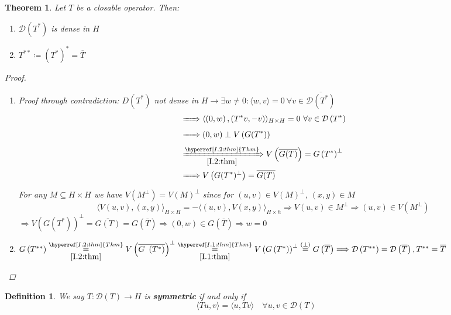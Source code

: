 \documentclass[12pt]{extreport} %
\newcommand{\DO}[1]{\mathcal{D}\left( {#1} \right)}
\theoremstyle{named}
\theoremstyle{nnamed}
\theoremstyle{itshape}
\newtheorem{definition}{Definition}  \counterwithin{definition}{chapter}
\newtheorem{theorem}{Theorem}  \counterwithin{theorem}{chapter}
\theoremstyle{normal}
\begin{document}
\begin{theorem} \label{I.3:thm}
	Let $T$ be a closable operator. Then:
	\begin{enumerate}
		\item $\DO{T^*}$ is dense in $H$
		\item $T^{**} \coloneqq \left( T^* \right)^* = \overline{T}$
	\end{enumerate}
	
	\begin{proof} ~\
		\begin{enumerate}
			\item Proof through contradiction: $D\left( T^* \right)$ not dense in $H \rightarrow \exists w \neq 0: \langle w, v \rangle = 0 ~\forall v \in \overline{\DO{T^*}}$
				\begin{align*}
					& \xRightarrow[]{~~~~} \langle \left( 0, w \right), \left( T^*v, -v \right) \rangle_{H \times H} = 0 ~\forall v \in \DO{T^*} \\
					& \xRightarrow[]{~~~~} \left( 0, w \right) \perp V \left( G(T^*) \right) \\
					& \xRightarrow[\ref{I.2:thm}]{\hyperref[I.2:thm]{Thm}} V \left( \overline{G(T)} \right) = G \left( T^* \right)^{\perp} \\
					& \xRightarrow[]{~~~~} V \left( G(T^*)^{\perp} \right) = \overline{G(T)}
				\end{align*}
				For any $M \subseteq H \times H$ we have $V \left( M^{\perp} \right) = V(M)^{\perp}$ since for $(u,v) \in V(M)^{\perp}$, $(x,y) \in M$
				$$ \langle V(u, v) , (x,y) \rangle_{H \times H} = - \langle (u, v ), V(x,y) \rangle_{H \times h} \Rightarrow V(u, v) \in M^{\perp} \Rightarrow (u, v) \in V\left( M^{\perp} \right) $$
				$\Longrightarrow V \left( G \left( T^* \right) \right)^{\perp} = \overline{G(T)} = G \left(\overline{T} \right) \Longrightarrow (0, w) \in G\left( \overline{T} \right) \Longrightarrow w = 0$
			\item $G \left( T^{**} \right) \overset{\hyperref[I.2:thm]{Thm}}{\underset{\ref{I.2:thm}}{=}} V \left( \overline{G \left( T^* \right)} \right)^{\perp} \overset{\hyperref[I.1:thm]{Thm}}{\underset{\ref{I.1:thm}}{=}} V \left( G \left( T^* \right) \right)^{\perp} \overset{(\perp)}{=} G \left( \overline{T} \right) \Longrightarrow \DO{T^{**}} = \DO{\overline{T}}, T^{**} = \overline{T}$
		\end{enumerate}
	\end{proof}
\end{theorem}

\begin{definition}
	We say $T \colon \DO{T} \rightarrow H$ is \textbf{symmetric} if and only if
	$$ \langle Tu, v \rangle = \langle u , Tv \rangle \quad \forall u, v \in \DO{T} $$
\end{definition}
\end{document}

